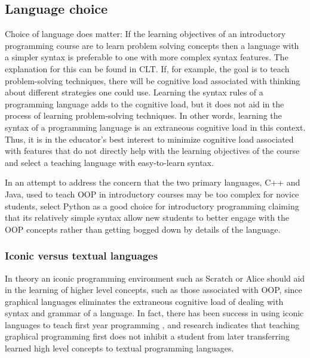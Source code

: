 \documentclass[12pt]{article}
\begin{document}
\subsection{Language choice}
Choice of language does matter: If the learning objectives of an
introductory programming course are to learn problem solving concepts
then a language with a simpler syntax is preferable to one with more
complex syntax features\autocite{koulouri_teaching_2014}. The
explanation for this can be found in CLT. If, for example, the goal is
to teach problem-solving techniques, there will be cognitive load
associated with thinking about different strategies one could
use. Learning the syntax rules of a programming language adds to the
cognitive load, but it does not aid in the process of learning
problem-solving techniques. In other words, learning the syntax of a
programming language is an extraneous cognitive load in this
context. Thus, it is in the educator's best interest to minimize
cognitive load associated with features that do not directly help with
the learning objectives of the course and select a teaching language
with easy-to-learn syntax.

In an attempt to address the concern that the two primary languages,
C++ and Java, used to teach OOP in introductory courses may be too
complex for novice students, \citeauthor{goldwasser_teaching_2008}
select Python as a good choice for introductory programming claiming
that its relatively simple syntax allow new students to better engage
with the OOP concepts rather than getting bogged down by details of
the language\autocite{goldwasser_teaching_2008}.

\subsubsection{Iconic versus textual languages}

In theory an iconic programming environment such as
Scratch\autocite{resnick_scratch_2009} or
Alice\autocite{cooper_using_2003} should aid in the learning of higher
level concepts, such as those associated with OOP, since graphical
languages eliminates the extraneous cognitive load of dealing with
syntax and grammar of a language. In fact, there has been success in
using iconic languages to teach first year programming
\autocite{calloni_iconic_1997}, and research indicates that teaching
graphical programming first does not inhibit a student from later
transferring learned high level concepts to textual programming
languages\autocite{hundhausen_can_2009}.
\end{document}
